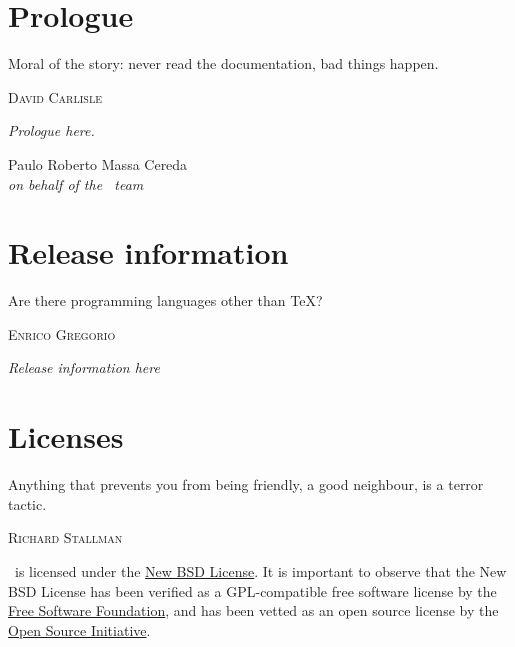 \documentclass[a4paper,twoside,12pt]{memoir}
\begin{document}
\chapter*{Prologue}
\label{chap:prologue}

\epigraph{Moral of the story: never read the documentation, bad things happen.}{\textsc{David Carlisle}}

\emph{Prologue here.}

\vfill

\begin{flushright}
Paulo Roberto Massa Cereda\\
\emph{on behalf of the \arara\ team}
\end{flushright}

\chapter*{Release information}
\label{chap:releaseinformation}

\epigraph{Are there programming languages other than \TeX?}{\textsc{Enrico Gregorio}}

\emph{Release information here}

\chapter*{Licenses}
\label{chap:licenses}

\epigraph{Anything that prevents you from being friendly, a good neighbour, is a terror tactic.}{\textsc{Richard Stallman}}

\noindent\arara\ is licensed under the \href{http://www.opensource.org/licenses/bsd-license.php}{New BSD License}. It is important to observe that the New BSD License has been verified as a GPL-compatible free software license by the \href{http://www.fsf.org/}{Free Software Foundation}, and has been vetted as an open source license by the \href{http://www.opensource.org/}{Open Source Initiative}.
\end{document}
